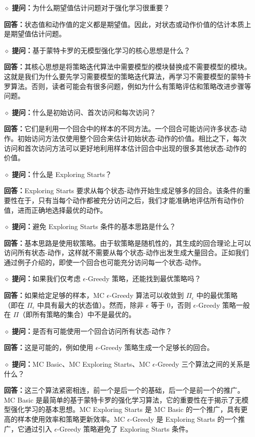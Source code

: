 $\diamond$ \textbf{提问：}为什么期望值估计问题对于强化学习很重要？

\textbf{回答：}状态值和动作值的定义都是期望值。因此，对状态或动作价值的估计本质上是期望值估计问题。

$\diamond$ \textbf{提问：}基于蒙特卡罗的无模型强化学习的核心思想是什么？

\textbf{回答：}其核心思想是将策略迭代算法中需要模型的模块替换成不需要模型的模块。这就是我们为什么要先学习需要模型的策略迭代算法，再学习不需要模型的蒙特卡罗算法。否则，读者可能会有很多问题，例如为什么有策略评估和策略改进步骤等问题。

$\diamond$ \textbf{提问：}什么是初始访问、首次访问和每次访问？

\textbf{回答：}它们是利用一个回合中的样本的不同方法。一个回合可能访问许多状态-动作。初始访问方法仅使用整个回合来估计初始状态-动作的价值。相比之下，每次访问和首次访问方法可以更好地利用样本估计回合中出现的很多其他状态-动作的价值。

$\diamond$ \textbf{提问：}什么是 Exploring Starts？

\textbf{回答：}Exploring Starts 要求从每个状态-动作开始生成足够多的回合。该条件的重要性在于，只有当每个动作都被充分访问之后，我们才能准确地评估所有动作价值，进而正确地选择最优的动作。

$\diamond$ \textbf{提问：}避免 Exploring Starts 条件的基本思路是什么？

\textbf{回答：}基本思路是使用软策略。由于软策略是随机性的，其生成的回合理论上可以访问所有状态-动作，这样就不需要从每个状态-动作出发生成大量回合。正如我们通过例子介绍的，即使一个回合也可能充分访问每一个状态-动作。

$\diamond$ \textbf{提问：}如果我们仅考虑 $\epsilon$-Greedy 策略，还能找到最优策略吗？

\textbf{回答：}如果给定足够的样本，MC $\epsilon$-Greedy 算法可以收敛到 $\varPi_{\epsilon}$ 中的最优策略（即在 $\varPi_{\epsilon}$ 中具有最大的状态值）。然而，除非 $\epsilon$ 等于 0，否则 $\epsilon$-Greedy 策略一般在 $\varPi$（即所有策略的集合）中不是最优的。

$\diamond$ \textbf{提问：}是否有可能使用一个回合访问所有状态-动作？

\textbf{回答：}这是可能的，例如使用 $\epsilon$-Greedy 策略生成一个足够长的回合。

$\diamond$ \textbf{提问：}MC Basic、MC Exploring Starts、MC $\epsilon$-Greedy 三个算法之间的关系是什么？

\textbf{回答：}这三个算法紧密相连，前一个是后一个的基础，后一个是前一个的推广。MC Basic 是最简单的基于蒙特卡罗的强化学习算法，它的重要性在于揭示了无模型强化学习的基本思想。MC Exploring Starts 是 MC Basic 的一个推广，具有更高的样本使用效率和策略更新效率。MC $\epsilon$-Greedy 是 Exploring Starts 的一个推广，它通过引入 $\epsilon$-Greedy 策略避免了 Exploring Starts 条件。
